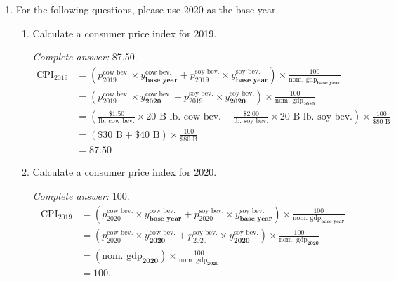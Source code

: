 \documentclass{assignment}
\begin{document}
\begin{enumerate}
\begin{enumerate}
\end{enumerate}

\item For the following questions, please use 2020 as the base year.

\begin{enumerate}

\item Calculate a consumer price index for 2019.

\begin{solution}
\emph{Complete answer:} 87.50.
\begin{align*}
\text{CPI}_{\text{2019}} &= 
\left( p^{\text{cow bev.}}_{\text{2019}} \times y^{\text{cow bev.}}_{\textbf{base year}} +
p^{\text{soy bev.}}_{\text{2019}} \times y^{\text{soy bev.}}_{\textbf{base year}} \right) \times \frac{100}{\text{nom.~gdp}_{\textbf{base year}}} \\
 &= 
\left( p^{\text{cow bev.}}_{\text{2019}} \times y^{\text{cow bev.}}_{\textbf{2020}} +
p^{\text{soy bev.}}_{\text{2019}} \times y^{\text{soy bev.}}_{\textbf{2020}} \right) \times \frac{100}{\text{nom.~gdp}_{\textbf{2020}}} \\
 &= 
\left( \frac{\$1.50}{\text{lb.~cow bev.}} \times 20 \text{~B~lb.~cow bev.} +
\frac{\$2.00}{\text{lb.~soy bev.}} \times 20 \text{~B~lb.~soy bev.} \right) \times \frac{100}{\$80 \text{~B}} \\
 &= \left( \$30 \text{~B} + \$40 \text{~B} \right) \times \frac{100}{\$80 \text{~B}} \\
 &= 87.50
\end{align*}
\end{solution}

\item Calculate a consumer price index for 2020.

\begin{solution}
\emph{Complete answer:} 100.
\begin{align*}
\text{CPI}_{\text{2019}} &= 
\left( p^{\text{cow bev.}}_{\text{2020}} \times y^{\text{cow bev.}}_{\textbf{base year}} +
p^{\text{soy bev.}}_{\text{2020}} \times y^{\text{soy bev.}}_{\textbf{base year}} \right) \times \frac{100}{\text{nom.~gdp}_{\textbf{base year}}} \\
 &= 
\left( p^{\text{cow bev.}}_{\text{2020}} \times y^{\text{cow bev.}}_{\textbf{2020}} +
p^{\text{soy bev.}}_{\text{2020}} \times y^{\text{soy bev.}}_{\textbf{2020}} \right) \times \frac{100}{\text{nom.~gdp}_{\textbf{2020}}} \\
 &= 
\left( \text{nom.~gdp}_{\textbf{2020}} \right) \times \frac{100}{\text{nom.~gdp}_{\textbf{2020}}} \\
 &= 100.
\end{align*}
\end{solution}


\end{enumerate}
\end{enumerate}
\end{document}
